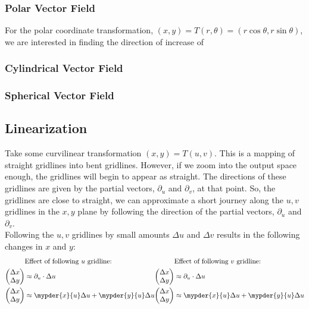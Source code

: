 \documentclass[11pt]{article}
\begin{document}
\subsubsection{Polar Vector Field}
For the polar coordinate transformation, $(x,y)=T(r,\theta)=(r\cos{\theta},r\sin{\theta})$, we are interested in finding the direction of increase of 
\subsubsection{Cylindrical Vector Field}
\subsubsection{Spherical Vector Field}
\subsection{Linearization}
Take some curvilinear transformation $(x,y) = T(u,v)$. This is a mapping of straight gridlines into bent gridlines. However, if we zoom into the output space enough, the gridlines will begin to appear as straight. The directions of these gridlines are given by the partial vectors, $\partial_u$ and $\partial_v$, at that point. So, the gridlines are close to straight, we can approximate a short journey along the $u,v$ gridlines in the $x,y$ plane by following the direction of the partial vectors, $\partial_u$ and $\partial_v$.\\
Following the $u,v$ gridlines by small amounts $\Delta u$ and $\Delta v$ results in the following changes in $x$ and $y$:
\begin{align*}
    \begin{split}
        &\text{Effect of following $u$ gridline:}\\
        \begin{pmatrix} \Delta x \\ \Delta y \end{pmatrix}
        &\approx \partial_u \cdot \Delta u \\
        \begin{pmatrix} \Delta x \\ \Delta y \end{pmatrix}
        &\approx \mypder{x}{u}\Delta u + \mypder{y}{u}\Delta u
    \end{split}
    \begin{split}
        &\text{Effect of following $v$ gridline:}\\
        \begin{pmatrix} \Delta x \\ \Delta y \end{pmatrix}
        &\approx \partial_u \cdot \Delta u \\
        \begin{pmatrix} \Delta x \\ \Delta y \end{pmatrix}
        &\approx \mypder{x}{u}\Delta u + \mypder{y}{u}\Delta u
    \end{split}
\end{align*}
\end{document}
